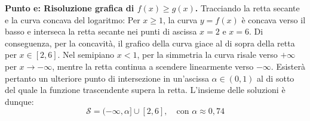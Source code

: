 \documentclass[11pt,a4paper,oneside]{report}
\begin{document}
\begin{dimostrazione}[Svolgimento]
\textbf{Punto e: Risoluzione grafica di $f(x) \ge g(x)$.}
Tracciando la retta secante e la curva concava del logaritmo:
Per $x \ge 1$, la curva $y = f(x)$ è concava verso il basso e interseca la retta secante nei punti di ascissa $x = 2$ e $x = 6$. Di conseguenza, per la concavità, il grafico della curva giace al di sopra della retta per $x \in [2, 6]$.
Nel semipiano $x < 1$, per la simmetria la curva risale verso $+\infty$ per $x \to -\infty$, mentre la retta continua a scendere linearmente verso $-\infty$. Esisterà pertanto un ulteriore punto di intersezione in un'ascissa $\alpha \in (0, 1)$ al di sotto del quale la funzione trascendente supera la retta.
L'insieme delle soluzioni è dunque:
\begin{equation}
    \mathcal{S} = (-\infty, \alpha] \cup [2, 6], \quad \text{con } \alpha \approx 0{,}74
\end{equation}
\end{dimostrazione}
\end{document}
